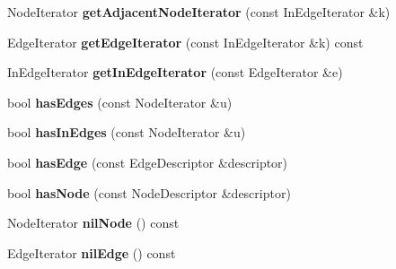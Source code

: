 \begin{DoxyCompactItemize}
\item 
\hypertarget{class_adjacency_list_impl_adec8318b86efda0832907b90ec8e85fe}{
NodeIterator {\bfseries getAdjacentNodeIterator} (const InEdgeIterator \&k)}
\label{class_adjacency_list_impl_adec8318b86efda0832907b90ec8e85fe}

\item 
\hypertarget{class_adjacency_list_impl_aa60d8acb1cd92a4630e6d204a84573a6}{
EdgeIterator {\bfseries getEdgeIterator} (const InEdgeIterator \&k) const }
\label{class_adjacency_list_impl_aa60d8acb1cd92a4630e6d204a84573a6}

\item 
\hypertarget{class_adjacency_list_impl_adc6cc43d724631cd0fc937d0de9a7c01}{
InEdgeIterator {\bfseries getInEdgeIterator} (const EdgeIterator \&e)}
\label{class_adjacency_list_impl_adc6cc43d724631cd0fc937d0de9a7c01}

\item 
\hypertarget{class_adjacency_list_impl_a0240806431e135b8125a6a1f06bd045e}{
bool {\bfseries hasEdges} (const NodeIterator \&u)}
\label{class_adjacency_list_impl_a0240806431e135b8125a6a1f06bd045e}

\item 
\hypertarget{class_adjacency_list_impl_a2b3a3212bbcfcaa1f2ee3839226f0a96}{
bool {\bfseries hasInEdges} (const NodeIterator \&u)}
\label{class_adjacency_list_impl_a2b3a3212bbcfcaa1f2ee3839226f0a96}

\item 
\hypertarget{class_adjacency_list_impl_aa4fd7750780fa63b74d77f7717d1aed0}{
bool {\bfseries hasEdge} (const EdgeDescriptor \&descriptor)}
\label{class_adjacency_list_impl_aa4fd7750780fa63b74d77f7717d1aed0}

\item 
\hypertarget{class_adjacency_list_impl_aca013303623f95b6833b12e27ff0b9d5}{
bool {\bfseries hasNode} (const NodeDescriptor \&descriptor)}
\label{class_adjacency_list_impl_aca013303623f95b6833b12e27ff0b9d5}

\item 
\hypertarget{class_adjacency_list_impl_aa0b793aba186d524c6f2a9989392b1db}{
NodeIterator {\bfseries nilNode} () const }
\label{class_adjacency_list_impl_aa0b793aba186d524c6f2a9989392b1db}

\item 
\hypertarget{class_adjacency_list_impl_a2450352a4f604c98d7bdf48b1de76525}{
EdgeIterator {\bfseries nilEdge} () const }
\label{class_adjacency_list_impl_a2450352a4f604c98d7bdf48b1de76525}


\end{DoxyCompactItemize}
